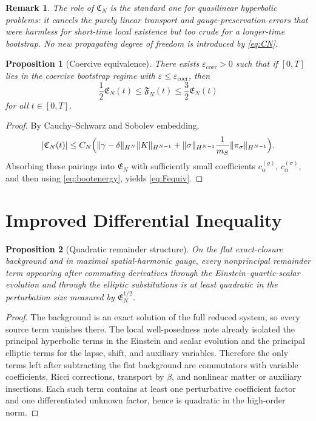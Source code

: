 \documentclass[11pt]{article}
\newtheorem{proposition}{Proposition}
\newtheorem{remark}{Remark}
\begin{document}
\begin{remark}
The role of \(\mathfrak C_N\) is the standard one for quasilinear hyperbolic problems: it cancels the purely linear transport and gauge-preservation errors that were harmless for short-time local existence but too crude for a longer-time bootstrap. No new propagating degree of freedom is introduced by \eqref{eq:CN}.
\end{remark}

\begin{proposition}[Coercive equivalence]
There exists \(\varepsilon_{\mathrm{coer}}>0\) such that if \([0,T]\) lies in the coercive bootstrap regime with \(\varepsilon\le \varepsilon_{\mathrm{coer}}\), then
\begin{equation}
\frac{1}{2}\mathfrak E_N(t)
\le
\mathfrak F_N(t)
\le
\frac{3}{2}\mathfrak E_N(t)
\label{eq:Fequiv}
\end{equation}
for all \(t\in[0,T]\).
\end{proposition}

\begin{proof}
By Cauchy--Schwarz and Sobolev embedding,
\[
|\mathfrak C_N(t)|
\le
C_N\Bigl(
\|\gamma-\delta\|_{H^N}\|K\|_{H^{N-1}}
+
\|\sigma\|_{H^{N-1}}\frac{1}{m_S}\|\pi_\sigma\|_{H^{N-1}}
\Bigr).
\]
Absorbing these pairings into \(\mathfrak E_N\) with sufficiently small coefficients \(c_\alpha^{(g)}\), \(c_\alpha^{(\sigma)}\), and then using \eqref{eq:bootenergy}, yields \eqref{eq:Fequiv}.
\end{proof}

\section{Improved Differential Inequality}

\begin{proposition}[Quadratic remainder structure]
On the flat exact-closure background and in maximal spatial-harmonic gauge, every nonprincipal remainder term appearing after commuting derivatives through the Einstein--quartic-scalar evolution and through the elliptic substitutions is at least quadratic in the perturbation size measured by \(\mathfrak E_N^{1/2}\).
\label{prop:quadratic}
\end{proposition}

\begin{proof}
The background is an exact solution of the full reduced system, so every source term vanishes there. The local well-posedness note already isolated the principal hyperbolic terms in the Einstein and scalar evolution and the principal elliptic terms for the lapse, shift, and auxiliary variables. Therefore the only terms left after subtracting the flat background are commutators with variable coefficients, Ricci corrections, transport by \(\beta\), and nonlinear matter or auxiliary insertions. Each such term contains at least one perturbative coefficient factor and one differentiated unknown factor, hence is quadratic in the high-order norm.
\end{proof}
\end{document}
